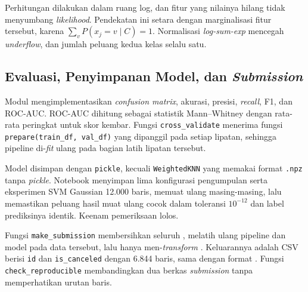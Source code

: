 Perhitungan dilakukan dalam ruang log, dan fitur yang nilainya hilang tidak menyumbang \textit{likelihood}. Pendekatan ini setara dengan marginalisasi fitur tersebut, karena $\sum_v P(x_j=v\mid C)=1$. Normalisasi \textit{log-sum-exp} mencegah \textit{underflow}, dan jumlah peluang kedua kelas selalu satu.

\subsection{Evaluasi, Penyimpanan Model, dan \textit{Submission}}
Modul  mengimplementasikan \textit{confusion matrix}, akurasi, presisi, \textit{recall}, F1, dan ROC-AUC. ROC-AUC dihitung sebagai statistik Mann--Whitney dengan rata-rata peringkat untuk skor kembar. Fungsi \texttt{cross\_validate} menerima fungsi \texttt{prepare(train\_df, val\_df)} yang dipanggil pada setiap lipatan, sehingga pipeline di-\textit{fit} ulang pada bagian latih lipatan tersebut.

Model disimpan dengan \texttt{pickle}, kecuali \texttt{WeightedKNN} yang memakai format \texttt{.npz} tanpa \textit{pickle}. Notebook menyimpan lima konfigurasi pengumpulan serta eksperimen SVM Gaussian 12.000 baris, memuat ulang masing-masing, lalu memastikan peluang hasil muat ulang cocok dalam toleransi $10^{-12}$ dan label prediksinya identik. Keenam pemeriksaan lolos.

Fungsi \texttt{make\_submission} membersihkan seluruh , melatih ulang pipeline dan model pada data tersebut, lalu hanya men-\textit{transform} . Keluarannya adalah CSV berisi \texttt{id} dan \texttt{is\_canceled} dengan 6.844 baris, sama dengan format . Fungsi \texttt{check\_reproducible} membandingkan dua berkas \textit{submission} tanpa memperhatikan urutan baris.
